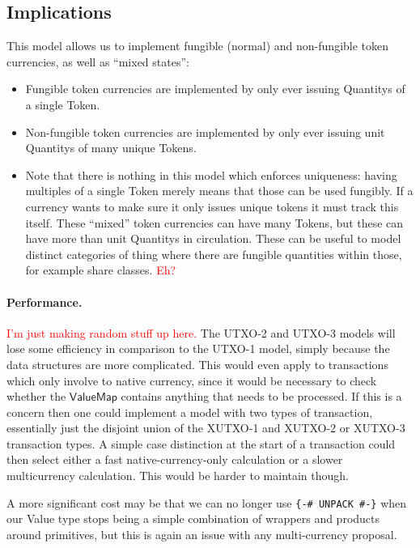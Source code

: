 \documentclass[a4paper]{article}
\newcommand{\red}[1]{\textcolor{red}{#1}}
\newcommand{\s}{\textsf}  %
\theoremstyle{definition}  %
\newcommand{\valuemap}{\ensuremath{\s{ValueMap}}}
\begin{document}
\subsection{Implications}
This model allows us to implement fungible (normal) and non-fungible
token currencies, as well as ``mixed states'':
\begin{itemize}
\item Fungible token currencies are implemented by only ever issuing
  \s{Quantity}s of a single \s{Token}.
\item Non-fungible token currencies are implemented by only ever
  issuing unit \s{Quantity}s of many unique \s{Token}s.
\item Note that there is nothing in this model which enforces
  uniqueness: having multiples of a single \s{Token} merely means that
  those can be used fungibly. If a currency wants to make sure it only
  issues unique tokens it must track this itself.  These ``mixed'' token
  currencies can have many \s{Token}s, but these can have more than unit
  \s{Quantity}s in circulation.  These can be useful to model distinct
  categories of thing where there are fungible quantities within
  those, for example share classes. \red{Eh?}
\end{itemize}

\paragraph{Performance.}
\red{I'm just making random stuff up here.}
The UTXO-2 and UTXO-3 models will lose some efficiency in comparison
to the UTXO-1 model, simply because the data structures are more
complicated.  This would even apply to transactions which only involve
to native currency, since it would be necessary to check whether the
\valuemap{} contains anything that needs to be processed.  If this is
a concern then one could implement a model with two types of
transaction, essentially just the disjoint union of the XUTXO-1 and
XUTXO-2 or XUTXO-3 transaction types. A simple case distinction at the
start of a transaction could then select either a fast
native-currency-only calculation or a slower multicurrency calculation.
This would be harder to maintain though.

\medskip
A more significant cost may be that we can no longer use \verb|{-# UNPACK #-}|
when our Value type stops being a simple combination of wrappers
and products around primitives, but this is again an issue with any
multi-currency proposal.
\end{document}
